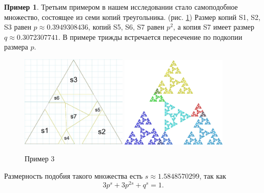 \documentclass[a4paper,14pt]{extarticle} %
\newcommand{\0}{\varnothing}
\newcommand{\8}{\infty}
\theoremstyle{definition}
\newtheorem{example}{Пример}
\begin{document}
\begin{example}\label{ex:3}
Третьим примером в нашем исследовании стало самоподобное множество, состоящее из семи копий треугольника. (рис. \ref{fig:pr3_скелет})
Размер копий S1, S2, S3 равен $p\approx0.3949308436$, копий S5, S6, S7 равен $p^2$, а копия S7 имеет размер $q\approx0.3072307741$.
В примере трижды встречается пересечение по подкопии размера $p$.

\begin{figure}[H]
    \centering
    \includegraphics[width=0.45\textwidth]{den_tr_скелет.png}
    \hfill
    \includegraphics[width=0.45\textwidth]{den_tr.png}
    \caption{Пример 3}
    \label{fig:pr3_скелет}
\end{figure}
Размерность подобия такого множества есть $s\approx1.5848570299$, так как
$$3p^s + 3p^{2s} + q^s = 1.$$


\end{example}
\end{document}
